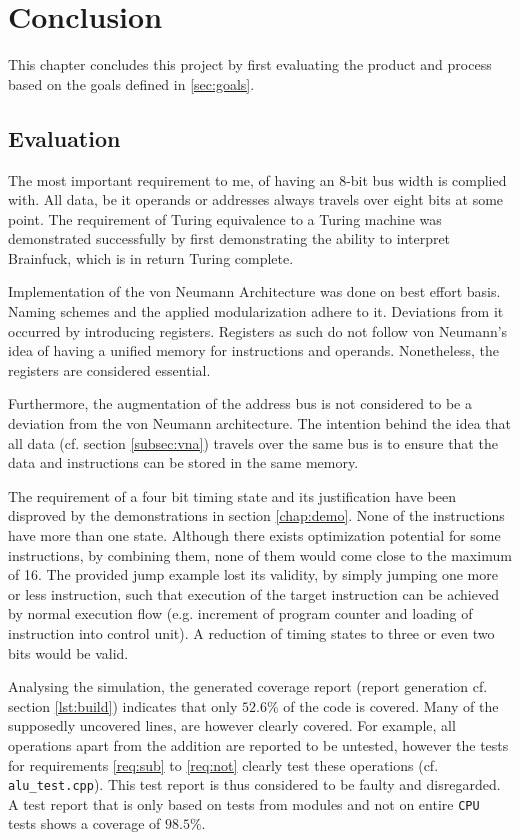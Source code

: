 \chapter{Conclusion} \label{chap:conclusion}
This chapter concludes this project by first evaluating the product and process based on the goals defined in \ref{sec:goals}.

\section{Evaluation}
The most important requirement to me, of having an 8-bit bus width is complied with. All data, be it operands or addresses always travels over eight bits at some point. The requirement of Turing equivalence to a Turing machine was demonstrated successfully by first demonstrating the ability to interpret Brainfuck, which is in return Turing complete.

Implementation of the von Neumann Architecture was done on best effort basis. Naming schemes and the applied modularization adhere to it. Deviations from it occurred by introducing registers. Registers as such do not follow von Neumann's idea of having a unified memory for instructions and operands. Nonetheless, the registers are considered essential.

Furthermore, the augmentation of the address bus is not considered to be a deviation from the von Neumann architecture. The intention behind the idea that all data (cf. section \ref{subsec:vna}) travels over the same bus is to ensure that the data and instructions can be stored in the same memory.

The requirement of a four bit timing state and its justification have been disproved by the demonstrations in section \ref{chap:demo}. None of the instructions have more than one state. Although there exists optimization potential for some instructions, by combining them, none of them would come close to the maximum of 16. The provided jump example lost its validity, by simply jumping one more or less instruction, such that execution of the target instruction can be achieved by normal execution flow (e.g. increment of program counter and loading of instruction into control unit). A reduction of timing states to three or even two bits would be valid.

Analysing the simulation, the generated coverage report (report generation cf. section \ref{lst:build}) indicates that only $52.6\%$ of the code is covered. Many of the supposedly uncovered lines, are however clearly covered. For example, all operations apart from the addition are reported to be untested, however the tests for requirements \ref{req:sub} to \ref{req:not} clearly test these operations (cf. \texttt{alu\_test.cpp}). This test report is thus considered to be faulty and disregarded. A test report that is only based on tests from modules and not on entire \texttt{CPU} tests shows a coverage of $98.5\%$.

